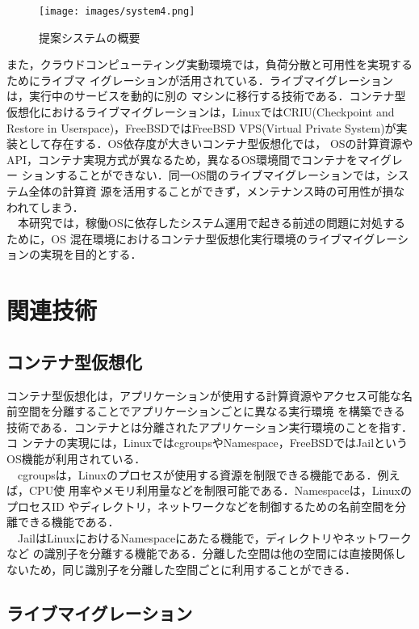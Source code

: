 \documentclass[10pt]{jarticle}
\begin{document}
\begin{figure*}[t]
  \centering
  \texttt{[image: images/system4.png]} \\
  \caption{提案システムの概要}
  \label{fig:system}
\end{figure*}

また，クラウドコンピューティング実動環境では，負荷分散と可用性を実現するためにライブマ
イグレーションが活用されている．ライブマイグレーションは，実行中のサービスを動的に別の
マシンに移行する技術である．コンテナ型仮想化におけるライブマイグレーションは，LinuxではCRIU(Checkpoint and Restore in Userspace)\cite{container_live,criu}，FreeBSDではFreeBSD VPS(Virtual Private
 System)\cite{freebsd-vps}が実装として存在する．OS依存度が大きいコンテナ型仮想化では，
 OSの計算資源やAPI，コンテナ実現方式が異なるため，異なるOS環境間でコンテナをマイグレー
 ションすることができない．同一OS間のライブマイグレーションでは，システム全体の計算資
 源を活用することができず，メンテナンス時の可用性が損なわれてしまう．\\
　本研究では，稼働OSに依存したシステム運用で起きる前述の問題に対処するために，OS
混在環境におけるコンテナ型仮想化実行環境のライブマイグレーションの実現を目的とする．

\section{関連技術}
\subsection{コンテナ型仮想化}
\label{sec:container}

コンテナ型仮想化は，アプリケーションが使用する計算資源やアクセス可能な名前空間を分離することでアプリケーションごとに異なる実行環境
を構築できる技術である．コンテナとは分離されたアプリケーション実行環境のことを指す．コ
ンテナの実現には，LinuxではcgroupsやNamespace，FreeBSDではJailというOS機能が利用されている\cite{docker}．\\
　cgroupsは，Linuxのプロセスが使用する資源を制限できる機能である．例えば，CPU使
用率やメモリ利用量などを制限可能である．Namespaceは，LinuxのプロセスID
やディレクトリ，ネットワークなどを制御するための名前空間を分離できる機能である．\\
　JailはLinuxにおけるNamespaceにあたる機能で，ディレクトリやネットワークなど
の識別子を分離する機能である．分離した空間は他の空間には直接関係しないため，同じ識別子を分離した空間ごとに利用することができる．

\subsection{ライブマイグレーション}
\end{document}
